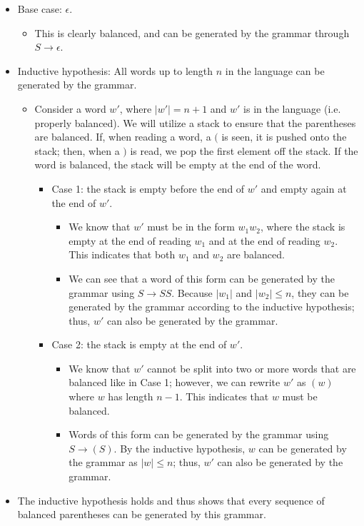\documentclass{article}
\begin{document}
\begin{itemize}
    \item Base case: \(\epsilon\). 
    \begin{itemize}
        \item This is clearly balanced, and can be generated by the grammar through \(S \to \epsilon\).
    \end{itemize}
    \item Inductive hypothesis: All words up to length \(n\) in the language can be generated by the grammar.
    \begin{itemize}
        \item Consider a word \(w'\), where \(|w'|=n+1\) and \(w'\) is in the language (i.e. properly balanced). We will utilize a stack to ensure that the parentheses are balanced. If, when reading a word, a \((\) is seen, it is pushed onto the stack; then, when a \()\) is read, we pop the first element off the stack. If the word is balanced, the stack will be empty at the end of the word.
        \begin{itemize}
            \item Case 1: the stack is empty before the end of \(w'\) and empty again at the end of \(w'\).
            \begin{itemize}
                \item We know that \(w'\) must be in the form \(w_1 w_2\), where the stack is empty at the end of reading \(w_1\) and at the end of reading \(w_2\). This indicates that both \(w_1\) and \(w_2\) are balanced.
                \item We can see that a word of this form can be generated by the grammar using \(S \to SS\). Because \(|w_1|\) and \(|w_2| \leq n\), they can be generated by the grammar according to the inductive hypothesis; thus, \(w'\) can also be generated by the grammar.
            \end{itemize}
            \item Case 2: the stack is empty at the end of \(w'\).
            \begin{itemize}
                \item We know that \(w'\) cannot be split into two or more words that are balanced like in Case 1; however, we can rewrite 
                \(w'\) as \((w)\) where \(w\) has length \(n-1\). This indicates that \(w\) must be balanced. 
                \item Words of this form can be generated by the grammar using \(S \to (S)\). By the inductive hypothesis, \(w\) can be generated by the grammar as \(|w|\leq n\); thus, \(w'\) can also be generated by the grammar.
            \end{itemize}
        \end{itemize}
    \end{itemize}
    \item The inductive hypothesis holds and thus shows that every sequence of balanced parentheses can be generated by this grammar.
\end{itemize}
\end{document}
